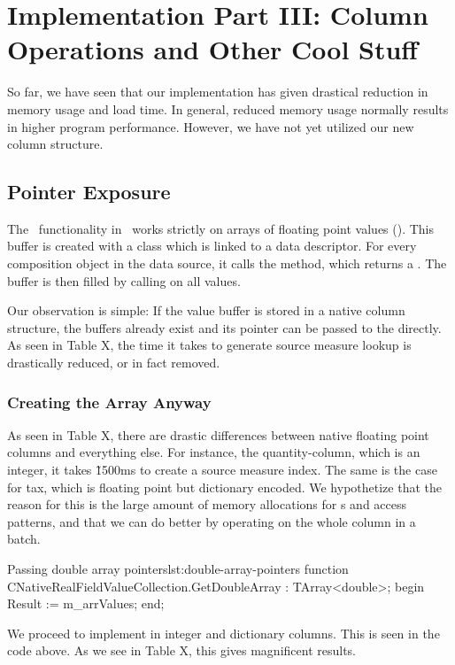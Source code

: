 \chapter{Implementation Part III: Column Operations and Other Cool Stuff}
\label{chap:part3}
So far, we have seen that our implementation has given drastical reduction in memory usage and load time. In general, reduced memory usage normally results in higher program performance. However, we have not yet utilized our new column structure.

\section{Pointer Exposure}
\label{sec:Pointer Exposure}
The \bd~functionality in \gap~works strictly on arrays of floating point values (). This buffer is created with a  class which is linked to a data descriptor. For every composition object in the data source, it calls the  method, which returns a . The buffer is then filled by calling  on all values. 

Our observation is simple: If the value buffer is stored in a native column structure, the buffers already exist and its pointer can be passed to the  directly. As seen in Table X, the time it takes to generate source measure lookup is drastically reduced, or in fact removed.

\subsection{Creating the Array Anyway}
\label{sub:Creating the Array Anyway}
As seen in Table X, there are drastic differences between native floating point columns and everything else. For instance, the quantity-column, which is an integer, it takes \~ 1500ms to create a source measure index. The same is the case for tax, which is floating point but dictionary encoded. We hypothetize that the reason for this is the large amount of memory allocations for s and access patterns, and that we can do better by operating on the whole column in a batch.

\begin{delphicode}{Passing double array pointers}{lst:double-array-pointers}
function CNativeRealFieldValueCollection.GetDoubleArray
: TArray<double>;
begin
  Result := m_arrValues;
end;
\end{delphicode}
We proceed to implement  in integer and dictionary columns. This is seen in the code above. As we see in Table X, this gives magnificent results.


